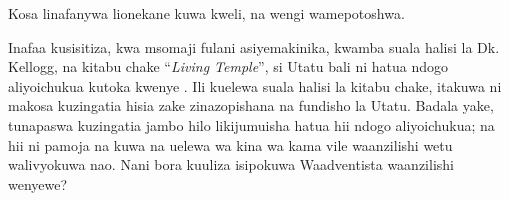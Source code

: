 Kosa linafanywa lionekane kuwa kweli, na wengi wamepotoshwa.

Inafaa kusisitiza, kwa msomaji fulani asiyemakinika, kwamba suala halisi la Dk. Kellogg, na kitabu chake “\textit{Living Temple}”, si Utatu bali ni hatua ndogo aliyoichukua kutoka kwenye . Ili kuelewa suala halisi la kitabu chake, itakuwa ni makosa kuzingatia hisia zake zinazopishana na fundisho la Utatu. Badala yake, tunapaswa kuzingatia jambo hilo likijumuisha hatua hii ndogo aliyoichukua; na hii ni pamoja na kuwa na uelewa wa kina wa  kama vile waanzilishi wetu walivyokuwa nao. Nani bora kuuliza isipokuwa Waadventista waanzilishi wenyewe?


